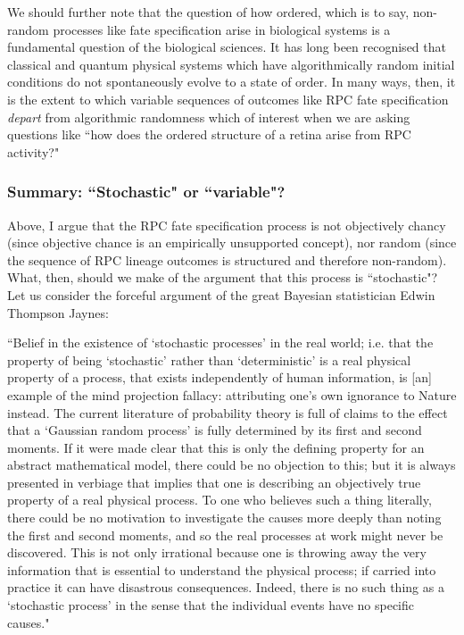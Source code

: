 We should further note that the question of how ordered, which is to say, non-random processes like fate specification arise in biological systems is a fundamental question of the biological sciences. It has long been recognised that classical and quantum physical systems which have algorithmically random initial conditions do not spontaneously evolve to a state of order. In many ways, then, it is the extent to which variable sequences of outcomes like RPC fate specification \textit{depart} from algorithmic randomness which of interest when we are asking questions like ``how does the ordered structure of a retina arise from RPC activity?"

\subsubsection{Summary: ``Stochastic" or ``variable"?}

Above, I argue that the RPC fate specification process is not objectively chancy (since objective chance is an empirically unsupported concept), nor random (since the sequence of RPC lineage outcomes is structured and therefore non-random). What, then, should we make of the argument that this process is ``stochastic"? Let us consider the forceful argument of the great Bayesian statistician Edwin Thompson Jaynes:

\begin{longquote}
 ``Belief in the existence of ‘stochastic processes’ in the real world; i.e. that the property of being ‘stochastic’ rather than ‘deterministic’ is a real physical property of a process, that exists independently of human information, is [an] example of the mind projection fallacy: attributing one’s own ignorance to Nature instead. The current literature of probability theory is full of claims to the effect that a ‘Gaussian random process’ is fully determined by its first and second moments. If it were made clear that this is only the defining property for an abstract mathematical model, there could be no objection to this; but it is always presented in verbiage that implies that one is describing an objectively true property of a real physical process. To one who believes such a thing literally, there could be no motivation to investigate the causes more deeply than noting the first and second moments, and so the real processes at work might never be discovered. This is not only irrational because one is throwing away the very information that is essential to understand the physical process; if carried into practice it can have disastrous consequences. Indeed, there is no such thing as a ‘stochastic process’ in the sense that the individual events have no specific causes." \cite{Jaynes2003}
 \end{longquote}
 
